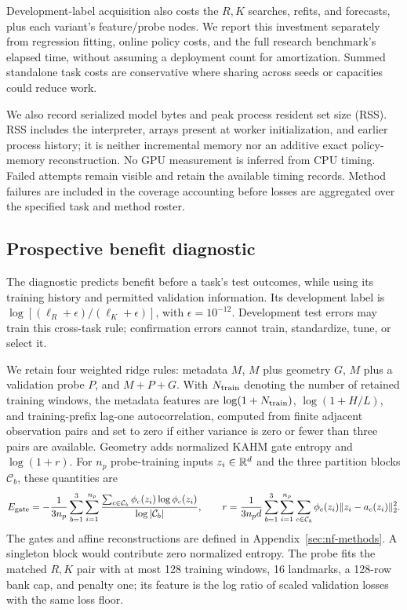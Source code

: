 Development-label acquisition also costs the $R,K$ searches, refits, and
forecasts, plus each variant's feature/probe nodes.  We report this investment
separately from regression fitting, online policy costs, and the full research
benchmark's elapsed time, without assuming a deployment count for amortization.
Summed standalone task costs are conservative where sharing across seeds or
capacities could reduce work.

We also record serialized model bytes and peak process resident set
size (RSS).  RSS includes the
interpreter, arrays present at worker initialization, and earlier process history; it is neither
incremental memory nor an additive exact policy-memory reconstruction.  No
GPU measurement is inferred from CPU timing.  Failed attempts remain visible
and retain the available timing records.  Method failures are included in the coverage accounting before losses
are aggregated over the specified task and method roster.

\subsection{Prospective benefit diagnostic}
\label{sec:nf-diagnostic}

The diagnostic predicts benefit before a task's test outcomes, while using
its training history and permitted validation information.  Its development
label is $\log[(\ell_R+\epsilon)/(\ell_K+\epsilon)]$, with
$\epsilon=10^{-12}$.  Development test errors may train this cross-task rule;
confirmation errors cannot train, standardize, tune, or select it.

We retain four weighted ridge rules: metadata $M$, $M$ plus geometry $G$,
$M$ plus a validation probe $P$, and $M+P+G$.  With $N_{\rm train}$ denoting the number of retained training windows,
the metadata features are $\log(1+N_{\rm train})$, $\log(1+H/L)$, and training-prefix lag-one
autocorrelation, computed from finite adjacent observation pairs and set
to zero if either variance is zero or fewer than three pairs are available.
Geometry adds normalized KAHM gate entropy and $\log(1+r)$. For
$n_p$ probe-training inputs $z_i\in\mathbb{R}^d$ and the three partition
blocks $\mathcal C_b$, these quantities are
\[
 E_{\rm gate}=-\frac{1}{3n_p}\sum_{b=1}^3\sum_{i=1}^{n_p}
 \frac{\sum_{c\in\mathcal C_b}\phi_c(z_i)\log\phi_c(z_i)}
 {\log|\mathcal C_b|},\qquad
 r=\frac{1}{3n_pd}\sum_{b=1}^3\sum_{i=1}^{n_p}
 \sum_{c\in\mathcal C_b}\phi_c(z_i)\|z_i-a_c(z_i)\|_2^2.
\]
The gates and affine reconstructions are defined in
Appendix~\ref{sec:nf-methods}. A singleton block would contribute
zero normalized entropy.  The probe fits the matched $R,K$ pair with at most 128 training
windows, 16 landmarks, a 128-row bank cap, and penalty one; its feature is
the log ratio of scaled validation losses with the same loss floor.

